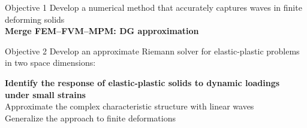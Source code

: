 \begin{withoutheadline}
\begin{frame}{\text{  }}
\begin{overprint}
      \begin{block}{Objective 1}
        Develop a numerical method that accurately captures waves in finite deforming solids \\
        \textbf{Merge FEM--FVM--MPM: DG approximation}
      \end{block}
      \begin{block}{Objective 2}
        Develop an approximate Riemann solver for elastic-plastic problems in two space dimensions:\\
        \begin{footnotesize}
          \vspace{-0.85cm}
          \begin{center}
            \textbf{Identify the response of elastic-plastic solids to dynamic loadings under small strains}\\
            Approximate the complex characteristic structure with linear waves\\
            Generalize the approach to finite deformations 
          \end{center}          
        \end{footnotesize}
      \end{block}
      \vspace{-0.3cm}

  \end{overprint}
\end{frame}
\end{withoutheadline}




